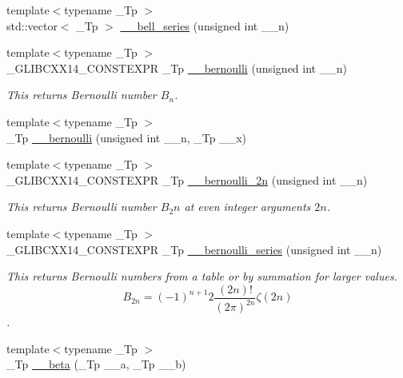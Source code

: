 \begin{DoxyCompactItemize}
\item 
{\footnotesize template$<$typename \+\_\+\+Tp $>$ }\\std\+::vector$<$ \+\_\+\+Tp $>$ \hyperlink{namespacestd_1_1____detail_acab68a50669a465d6bddc7a54a649819}{\+\_\+\+\_\+bell\+\_\+series} (unsigned int \+\_\+\+\_\+n)
\item 
{\footnotesize template$<$typename \+\_\+\+Tp $>$ }\\\+\_\+\+G\+L\+I\+B\+C\+X\+X14\+\_\+\+C\+O\+N\+S\+T\+E\+X\+PR \+\_\+\+Tp \hyperlink{namespacestd_1_1____detail_a68ae2aecb4cdf37b72cd60409cdc500c}{\+\_\+\+\_\+bernoulli} (unsigned int \+\_\+\+\_\+n)
\begin{DoxyCompactList}\small\item\em This returns Bernoulli number $ B_n $. \end{DoxyCompactList}\item 
{\footnotesize template$<$typename \+\_\+\+Tp $>$ }\\\+\_\+\+Tp \hyperlink{namespacestd_1_1____detail_a1171e65b7fb7712f0181fe7288acb343}{\+\_\+\+\_\+bernoulli} (unsigned int \+\_\+\+\_\+n, \+\_\+\+Tp \+\_\+\+\_\+x)
\item 
{\footnotesize template$<$typename \+\_\+\+Tp $>$ }\\\+\_\+\+G\+L\+I\+B\+C\+X\+X14\+\_\+\+C\+O\+N\+S\+T\+E\+X\+PR \+\_\+\+Tp \hyperlink{namespacestd_1_1____detail_abd0b1f05f2b32a21cad034b38473bb8b}{\+\_\+\+\_\+bernoulli\+\_\+2n} (unsigned int \+\_\+\+\_\+n)
\begin{DoxyCompactList}\small\item\em This returns Bernoulli number $ B_2n $ at even integer arguments $ 2n $. \end{DoxyCompactList}\item 
{\footnotesize template$<$typename \+\_\+\+Tp $>$ }\\\+\_\+\+G\+L\+I\+B\+C\+X\+X14\+\_\+\+C\+O\+N\+S\+T\+E\+X\+PR \+\_\+\+Tp \hyperlink{namespacestd_1_1____detail_ad3d3e44d340742b0362a8ad95080d315}{\+\_\+\+\_\+bernoulli\+\_\+series} (unsigned int \+\_\+\+\_\+n)
\begin{DoxyCompactList}\small\item\em This returns Bernoulli numbers from a table or by summation for larger values. \[ B_{2n} = (-1)^{n+1} 2\frac{(2n)!}{(2\pi)^{2n}} \zeta(2n) \]. \end{DoxyCompactList}\item 
{\footnotesize template$<$typename \+\_\+\+Tp $>$ }\\\+\_\+\+Tp \hyperlink{namespacestd_1_1____detail_a090d2f0920e0d208c467609b2a81d717}{\+\_\+\+\_\+beta} (\+\_\+\+Tp \+\_\+\+\_\+a, \+\_\+\+Tp \+\_\+\+\_\+b)

\end{DoxyCompactItemize}
